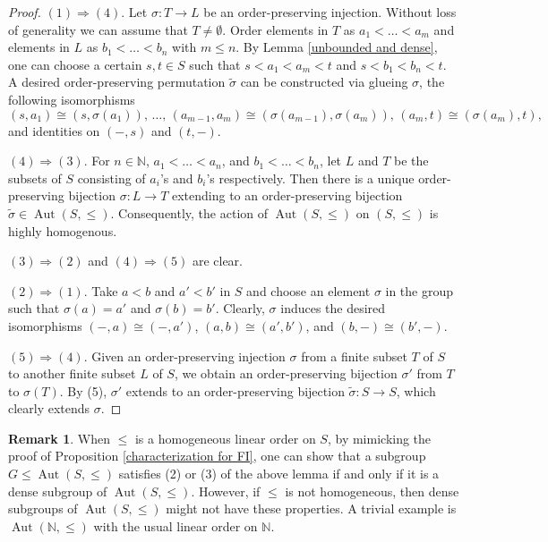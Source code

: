 \documentclass[11pt, reqno]{amsart}
\theoremstyle{plain}
\numberwithin{equation}{section}
\theoremstyle{definition}
\newtheorem{remark}[theorem]{Remark}
\DeclareMathOperator{\Aut}{Aut}
\begin{document}
\begin{proof}
$(1) \Rightarrow (4)$. Let $\sigma: T \to L$ be an order-preserving injection. Without loss of generality we can assume that $T \neq \emptyset$. Order elements in $T$ as $a_1 < \ldots < a_m$ and elements in $L$ as $b_1 < \ldots < b_n$ with $m \leqslant n$. By Lemma \ref{unbounded and dense}, one can choose a certain $s, t \in S$ such that $s < a_1 < a_m < t$ and $s < b_1 < b_n < t$. A desired order-preserving permutation $\tilde{\sigma}$ can be constructed via glueing $\sigma$, the following isomorphisms
\[
(s, a_1) \cong (s, \sigma(a_1)), \, \ldots, \, (a_{m-1}, a_m) \cong (\sigma(a_{m-1}), \sigma(a_m)), \, (a_m, t) \cong (\sigma(a_m), t),
\]
and identities on $(-, s)$ and $(t, -)$.

$(4) \Rightarrow (3)$. For $n \in \mathbb{N}$, $a_1 < \ldots < a_n$, and $b_1 < \ldots < b_n$, let $L$ and $T$ be the subsets of $S$ consisting of $a_i$'s and $b_i$'s respectively. Then there is a unique order-preserving bijection $\sigma: L \to T$ extending to an order-preserving bijection $\tilde{\sigma} \in \Aut(S, \leqslant)$. Consequently, the action of $\Aut(S, \leqslant)$ on $(S, \leqslant)$ is highly homogenous.

$(3) \Rightarrow (2)$ and $(4) \Rightarrow (5)$ are clear.

$(2) \Rightarrow (1)$. Take $a < b$ and $a' < b'$ in $S$ and choose an element $\sigma$ in the group such that $\sigma(a) = a'$ and $\sigma(b) = b'$. Clearly, $\sigma$ induces the desired isomorphisms $(-, a) \cong (-, a')$, $(a, b) \cong (a', b')$, and $(b, -) \cong (b', -)$.

$(5) \Rightarrow (4)$. Given an order-preserving injection $\sigma$ from a finite subset $T$ of $S$ to another finite subset $L$ of $S$, we obtain an order-preserving bijection $\sigma'$ from $T$ to $\sigma(T)$. By (5), $\sigma'$ extends to an order-preserving bijection $\tilde{\sigma}: S \to S$, which clearly extends $\sigma$.
\end{proof}

\begin{remark}
When $\leqslant$ is a homogeneous linear order on $S$, by mimicking the proof of Proposition \ref{characterization for FI}, one can show that a subgroup $G \leqslant \Aut(S, \leqslant)$ satisfies (2) or (3) of the above lemma if and only if it is a dense subgroup of $\Aut(S, \leqslant)$. However, if $\leqslant$ is not homogeneous, then dense subgroups of $\Aut(S, \leqslant)$ might not have these properties. A trivial example is $\Aut(\mathbb{N}, \leqslant)$ with the usual linear order on $\mathbb{N}$.
\end{remark}
\end{document}
